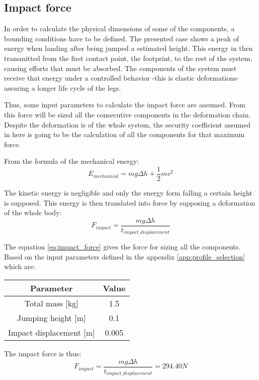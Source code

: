 \subsection{Impact force} %
\label{sub:impact_force}
In order to calculate the physical dimensions of some of the components, a bounding conditions have to be defined.
The presented case shows a peak of energy when landing after being jumped a estimated height.
This energy in then transmitted from the first contact point, the footprint, to the rest of the system, causing efforts that must be absorbed.
The components of the system must receive that energy under a controlled behavior -this is elastic deformations- assuring a longer life cycle of the legs.

Thus, some input parameters to calculate the impact force are assumed.
From this force will be sized all the consecutive components in the deformation chain.
Despite the deformation is of the whole system, the security coefficient assumed in here is going to be the calculation of all the components for that maximum force.

From the formula of the mechanical energy:
\begin{equation}
  E_{mechanical} = m g \Delta h + \frac{1}{2} m v^{2}
\end{equation}

The kinetic energy is negligible and only the energy form falling a certain height is supposed.
This energy is then translated into force by supposing a deformation of the whole body:
\begin{equation}
\label{eq:impact_force}
  F_{impact} = \frac{m g \Delta h}{t_{impact\_displacement}}
\end{equation}

The equation \ref{eq:impact_force} gives the force for sizing all the components.
Based on the input parameters defined in the appendix \ref{app:profile_selection} which are:
\begin{center}
\begin{tabular}{c | c}
  Parameter & Value \\
  \hline
  Total mass [kg] & 1.5 \\
  Jumping height [m] & 0.1 \\
  Impact displacement [m] & 0.005
\end{tabular}
\end{center}

The impact force is thus:
\begin{equation}
  F_{impact} = \frac{m g \Delta h}{t_{impact\_displacement}} = 294.40 N 
\end{equation}
